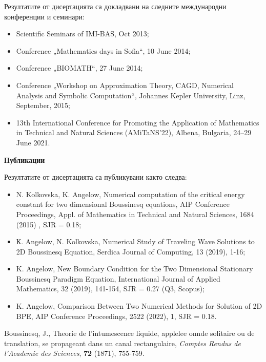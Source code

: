\documentclass[a5paper]{article}
\theoremstyle{remark}
\begin{document}
\begin{large}
Резултатите от дисертацията са докладвани на следните международни конференции и семинари:
\begin{itemize}
\item Scientific Seminars of IMI-BAS, Oct 2013;

\item Conference „Mathematics days in Sofia“, 10 June 2014;

\item Conference „BIOMATH“, 27 June 2014;

\item Conference „Workshop on Approximation Theory, CAGD, Numerical Analysis and Symbolic Computation“,  Johannes Kepler University, Linz, September, 2015;

\item 13th International Conference for Promoting the Application of Mathematics in Technical and Natural Sciences (AMiTaNS’22), Albena, Bulgaria, 24–29 June 2021. 
\end{itemize}
\vspace{0.2cm}
\textbf{\Large Публикации}
\vspace{0.3cm}

Резултатите от дисертацията са публикувани както следва:
\begin{itemize}
\item N. Kolkovska, K. Angelow, Numerical computation of the critical energy constant for two dimensional Boussinesq equations, AIP Conference Proceedings, Appl. of Mathematics in Technical and Natural Sciences, 1684 (2015) , SJR = 0.18;

\item К. Angelow, N. Kolkovska, Numerical Study of Traveling Wave Solutions to 2D Boussinesq Equation, Serdica Journal of Computing, 13 (2019), 1-16;

\item K. Angelow, New Boundary Condition for the Two Dimensional Stationary Boussinesq Paradigm Equation, International Journal of Applied Mathematics, 32 (2019), 141-154, SJR = 0.27 (Q3, Scopus);

\item K. Angelow, Comparison Between Two Numerical Methods for Solution of 2D BPE, AIP Conference Proceedings, 2522 (2022), 1, SJR = 0.18.
\end{itemize}

\newpage
\begin{thebibliography}{99}

 Boussinesq, J., Theorie de l'intumescence liquide, applelee onnde solitaire ou de translation, se propageant dans un canal rectangulaire, {\it Comptes Rendus de l'Academie des Sciences}, \textbf{72} (1871), 755-759.


\end{thebibliography}
\end{large}
\end{document}
